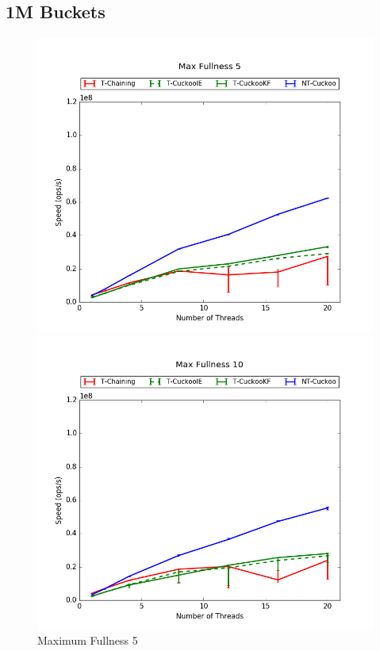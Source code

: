 \subsection{1M Buckets}
\begin{figure}[H]
    \centering
	\begin{minipage}{0.45\textwidth}\includegraphics[width=\textwidth]{maps/5HM1M:F34,I33,E33.png} 
        \caption*{Maximum Fullness 5}
    \end{minipage}
	\begin{minipage}{0.45\textwidth}\includegraphics[width=\textwidth]{maps/10HM1M:F34,I33,E33.png} 

\end{minipage}
\end{figure}

